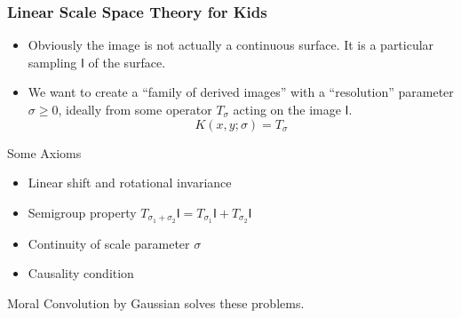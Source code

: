 \documentclass[9pt]{beamer}
\newcommand{\img}{\mathsf{I}} %
\begin{document}
\begin{frame}
\frametitle[Scale Space Theory]{Linear Scale Space Theory for Kids}
\begin{itemize}
  \item Obviously the image is not actually a continuous surface.
        It is a particular sampling $\img$ of the surface. 
  \item We want to create a ``family of derived images'' with a ``resolution'' parameter $\sigma \ge 0$,
        ideally from some operator $T_\sigma$ acting on the image $\img$.
  \begin{equation*}
  K(x,y;\sigma) = T_\sigma
  \end{equation*}
\end{itemize}

\begin{block}{Some Axioms}
  \begin{itemize}
    \item Linear shift and rotational invariance
    \item Semigroup property $T_{\sigma_1 + \sigma_2}\img = T_{\sigma_1}\img + T_{\sigma_2}\img$
    \item Continuity of scale parameter $\sigma$
    \item Causality condition
    \end{itemize}
  \end{block}
\begin{block}{Moral}
  Convolution by Gaussian solves these problems.
\end{block}
\end{frame}
\end{document}
